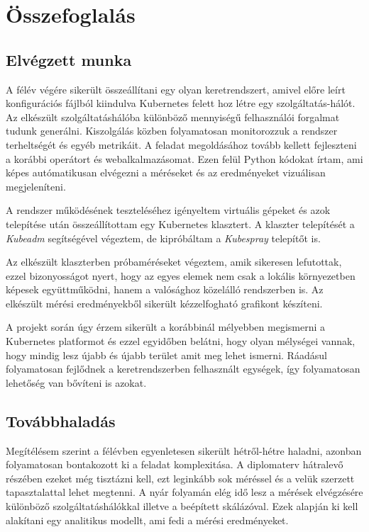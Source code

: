 \chapter{Összefoglalás}
\label{sec:summary}


\section{Elvégzett munka}

A félév végére sikerült összeállítani egy olyan keretrendszert, amivel előre leírt konfigurációs
fájlból kiindulva Kubernetes felett hoz létre egy szolgáltatás-hálót. Az elkészült
szolgáltatáshálóba különböző mennyiségű felhasználói forgalmat tudunk generálni. Kiszolgálás közben
folyamatosan monitorozzuk a rendszer terheltségét és egyéb metrikáit. A feladat megoldásához tovább kellett fejleszteni a korábbi operátort és webalkalmazásomat. Ezen felül Python kódokat írtam, ami képes autómatikusan elvégezni a méréseket és az eredményeket vizuálisan megjeleníteni.

A rendszer működésének teszteléséhez igényeltem virtuális gépeket és azok telepítése után összeállítottam egy Kubernetes klasztert. A klaszter telepítését a \textit{Kubeadm} segítségével végeztem, de kipróbáltam a \textit{Kubespray} telepítőt is. 

Az elkészült klaszterben próbaméréseket végeztem, amik sikeresen lefutottak, ezzel bizonyosságot nyert, hogy az egyes elemek nem csak a lokális környezetben képesek együttműködni, hanem a valósághoz közelálló rendszerben is. Az elkészült mérési eredményekből  sikerült kézzelfogható grafikont készíteni. 

A projekt során úgy érzem sikerült a korábbinál mélyebben megismerni a Kubernetes platformot és ezzel egyidőben belátni, hogy olyan mélységei vannak, hogy mindig lesz újabb és újabb terület amit meg lehet ismerni. Ráadásul folyamatosan fejlődnek a keretrendszerben felhasznált egységek, így folyamatosan lehetőség van bővíteni is azokat.

\section{Továbbhaladás}
Megítélésem szerint a félévben egyenletesen sikerült hétről-hétre haladni, azonban folyamatosan bontakozott ki a feladat komplexitása. A diplomaterv hátralevő részében ezeket még tisztázni kell, ezt leginkább sok méréssel és a velük szerzett tapasztalattal lehet megtenni. A nyár folyamán elég idő lesz a mérések elvégzésére különböző szolgáltatáshálókkal illetve a beépített skálázóval. Ezek alapján ki kell alakítani egy analitikus modellt, ami fedi a mérési eredményeket. 

